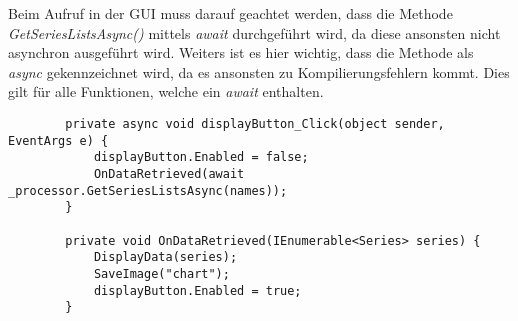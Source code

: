\documentclass[a4paper,ngerman]{scrartcl}
\begin{document}
Beim Aufruf in der GUI muss darauf geachtet werden, dass die Methode \textit{GetSeriesListsAsync()} mittels \textit{await} durchgeführt wird, da diese ansonsten nicht asynchron ausgeführt wird.
Weiters ist es hier wichtig, dass die Methode als \textit{async} gekennzeichnet wird, da es ansonsten zu Kompilierungsfehlern kommt. Dies gilt für alle Funktionen, welche ein \textit{await} enthalten. 

\begin{lstlisting}
        private async void displayButton_Click(object sender, EventArgs e) {
            displayButton.Enabled = false;
            OnDataRetrieved(await _processor.GetSeriesListsAsync(names));
        }

        private void OnDataRetrieved(IEnumerable<Series> series) {
            DisplayData(series);
            SaveImage("chart");
            displayButton.Enabled = true;
        }
\end{lstlisting}
\end{document}

